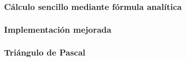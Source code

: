 \subsubsection{Cálculo sencillo mediante fórmula analítica}

\subsubsection{Implementación mejorada}

\subsubsection{Triángulo de Pascal}